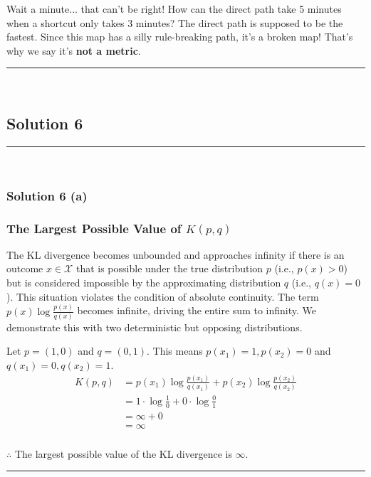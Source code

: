 \documentclass{article}
\begin{document}
Wait a minute... that can't be right! How can the direct path take 5 minutes when a shortcut only takes 3 minutes? The direct path is supposed to be the fastest. Since this map has a silly rule-breaking path, it's a broken map! That's why we say it's \textbf{not a metric}.


\noindent\rule{\textwidth}{0.4pt}\\

\newpage

\subsection*{Solution 6}
\noindent\rule{\textwidth}{0.4pt}\\
\subsubsection*{Solution 6 (a)}

\subsubsection*{The Largest Possible Value of $K(p, q)$}
\parbox{\textwidth}{
The KL divergence becomes unbounded and approaches infinity if there is an outcome $x \in \mathcal{X}$ that is possible under the true distribution $p$ (i.e., $p(x) > 0$) but is considered impossible by the approximating distribution $q$ (i.e., $q(x) = 0$). This situation violates the condition of absolute continuity. The term $p(x) \log \frac{p(x)}{q(x)}$ becomes infinite, driving the entire sum to infinity. We demonstrate this with two deterministic but opposing distributions.
}
\parbox{\textwidth}{
Let $p=(1, 0)$ and $q=(0, 1)$. This means $p(x_1)=1, p(x_2)=0$ and $q(x_1)=0, q(x_2)=1$.
\begin{align*}
    K(p, q) &= p(x_1) \log\frac{p(x_1)}{q(x_1)} + p(x_2) \log\frac{p(x_2)}{q(x_2)} \\
    &= 1 \cdot \log\frac{1}{0} + 0 \cdot \log\frac{0}{1} \\
    &= \infty + 0 \\
    &= \infty
\end{align*}
}
\subsubsection*{\normalfont}{$\therefore$ The largest possible value of the KL divergence is $\infty$.}


\noindent\rule{\textwidth}{0.4pt}\\
\end{document}
